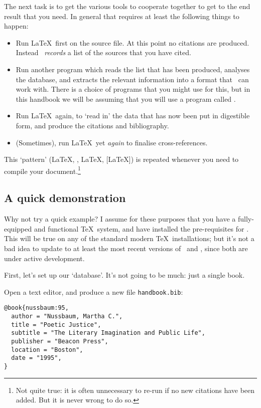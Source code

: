 The next task is to get the various tools to cooperate together to get
to the end result that you need. In general that requires at least the
following things to happen:
\begin{itemize}
\item Run \LaTeX\ first on the source file. At this point no citations
  are produced. Instead \biblatex\ \emph{records} a list of the
  sources that you have cited.
\item Run another program which reads the list that has been produced,
  analyses the database, and extracts the relevant information into a
  format that \biblatex\ can work with. There is a choice of programs
  that you might use for this, but in this handbook we will be
  assuming that you will use a program called .
\item Run \LaTeX\ again, to `read in' the data that has now been put
  in digestible form, and produce the citations and bibliography.
\item (Sometimes), run \LaTeX\ yet \emph{again} to finalise cross-references.
\end{itemize}

This `pattern' (\LaTeX, , \LaTeX, [\LaTeX]) is repeated
whenever you need to compile your document.\footnote{Not quite true:
  it is often unnecessary to re-run  if no new
  citations have been added. But it is never wrong to do so.}

\subsection{A quick demonstration\label{neophyte:example}}

Why not try a quick example? I assume for these purposes that you have
a fully-equipped and functional \TeX\ system, and have installed the
pre-requisites for \biblatex. This will be true on any of the standard
modern \TeX\ installations; but it's not a bad idea to update to at
least the most recent versions of \biblatex\ and ,
since both are under active development.

First, let's set up our `database'. It's not going to be much: just a
single book.

Open a text editor, and produce a new file
\texttt{handbook.bib}:

\begin{verbatim}
@book{nussbaum:95,
  author = "Nussbaum, Martha C.",
  title = "Poetic Justice",
  subtitle = "The Literary Imagination and Public Life",
  publisher = "Beacon Press",
  location = "Boston",
  date = "1995",
}
\end{verbatim}

